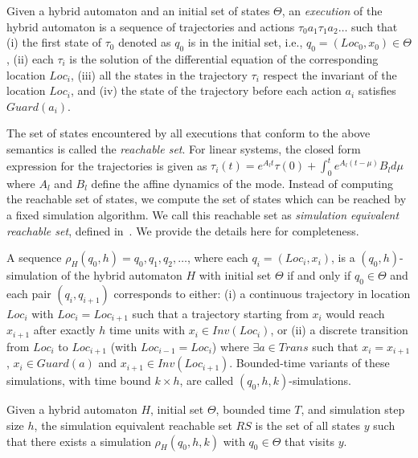 \begin{definition}
\label{def:hybridExecution}
Given a hybrid automaton and an initial set of states $\Theta$, an \emph{execution} of the hybrid automaton is a sequence of trajectories and actions $\tau_0 a_1 \tau_1 a_2 \ldots $ such that
%
(i) the first state of $\tau_0$ denoted as $q_0$ is in the initial set, i.e., $q_0 = (Loc_0, x_0)\in \Theta$,
%
(ii) each $\tau_i$ is the solution of the differential equation of the corresponding location $Loc_i$, 
%
(iii) all the states in the trajectory $\tau_i$ respect the invariant of the location $Loc_i$,
%
and (iv) the state of the trajectory before each action $a_i$ satisfies $Guard(a_i)$.
\end{definition}
%
The set of states encountered by all executions that conform to the above semantics is called the \emph{reachable set}.
For linear systems, the closed form expression for the trajectories is given as $\tau_i(t) = e^{A_l t}\tau(0) + \int_{0}^{t}e^{A_l (t-\mu)}B_l d\mu$
where $A_l$ and $B_l$ define the affine dynamics of the mode.
%
Instead of computing the reachable set of states, we compute the set of states which can be reached by a fixed simulation algorithm.
%
We call this reachable set as \emph{simulation equivalent reachable set}, defined in~\cite{bak2017tacas}. We provide the details here for completeness.

\begin{definition}
\label{def:stepSim}
A sequence $\rho_{H}(q_0,h) = q_0, q_1, q_2, \ldots$, where each $q_i = (Loc_i, x_i)$, is a $(q_0, h)$-simulation of the hybrid automaton $H$ with initial set $\Theta$ if and only if $q_0 \in \Theta$ and each pair $(q_i, q_{i+1})$ corresponds to either: 
%
(i) a continuous trajectory in location $Loc_i$ with $Loc_i=Loc_{i+1}$ such that a trajectory starting from $x_i$ would reach $x_{i+1}$ after exactly $h$ time units with $x_i \in Inv(Loc_i)$, or 
%
(ii) a discrete transition from $Loc_i$ to $Loc_{i+1}$ (with $Loc_{i-1} = Loc_i$) where  $\exists a \in Trans$ such that $x_i = x_{i+1}$, $x_i \in Guard(a)$ and $x_{i+1} \in
Inv(Loc_{i+1})$.
%
Bounded-time variants of these simulations, with time bound $k\times h$, are called $(q_0, h, k)$-simulations.
\end{definition}

\begin{definition}
\label{def:simRS}
Given a hybrid automaton $H$, initial set $\Theta$, bounded time $T$, and simulation step size $h$, the simulation equivalent reachable set $RS$ is the set of all states $y$ such that there exists a simulation $\rho_{H}(q_0, h, k)$ with $q_0 \in \Theta$ that visits $y$.
\end{definition}

